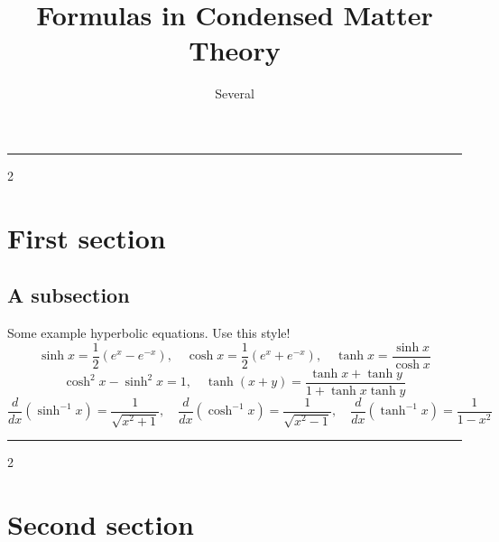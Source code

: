 \documentclass[12pt]{extarticle}
\title{Formulas in Condensed Matter Theory}
\author{Several}
\newcommand{\mysection}[1]{
\vspace{1mm}
\hrule2
\section{\Huge{#1}}}
\begin{document}
\begin{center}
\end{center}

\begin{multicols*}{2}
\setlength{\columnseprule}{0.3pt}

\mysection{First section}
\subsection{A subsection}
Some example hyperbolic equations. Use this style!
$$\sinh x= \dfrac{1}{2} \left( e^{x} - e^{-x} \right), \quad \cosh x= \dfrac{1}{2} \left( e^{x} + e^{-x} \right), \quad \tanh x= \dfrac{\sinh x}{\cosh x}$$
$$\cosh ^2 x - \sinh ^2 x = 1, \quad \tanh (x+y) = \dfrac{\tanh x + \tanh y}{1+\tanh x \tanh y}$$
$$\dfrac{d}{dx}(\sinh^{-1} x)=\dfrac{1}{\sqrt{x^2+1}}, \quad \dfrac{d}{dx}(\cosh^{-1} x)=\dfrac{1}{\sqrt{x^2-1}}, \quad \dfrac{d}{dx}(\tanh^{-1} x)=\dfrac{1}{1-x^2}$$

\mysection{Second section}

\end{multicols*}
\end{document}

